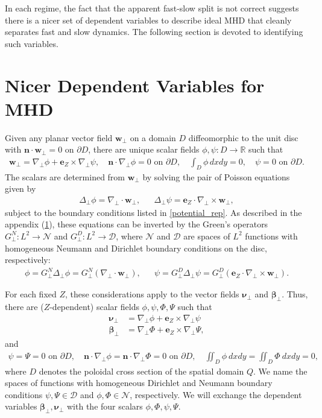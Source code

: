 \documentclass{article}
\newcommand{\np}{\nabla_\perp}
\newcommand{\lap}{\Delta_\perp}
\newcommand{\p}{\partial}
\newcommand{\GN}{G_\perp^N}
\newcommand{\GD}{G_\perp^D}
\newcommand{\pth} [1] {\left( #1 \right) }
\begin{document}
In each regime, the fact that the apparent fast-slow split is not correct suggests there is a nicer set of dependent variables to describe ideal MHD that cleanly separates fast and slow dynamics. The following section is devoted to identifying such variables.


\section{Nicer Dependent Variables for MHD}
Given any planar vector field $\bm{w}_\perp$ on a domain $D$ diffeomorphic to the unit disc with $\bm{n}\cdot\bm{w}_\perp = 0$ on $\partial D$, there are unique scalar fields $\phi,\psi:D\rightarrow\mathbb{R}$ such that
\begin{align}
\bm{w}_\perp = \np\phi + \bm{e}_Z\times\np\psi,\quad \bm{n}\cdot\np\phi = 0\text{ on }\partial D,\quad \int_D\phi \,dxdy = 0,\quad \psi = 0\text{ on }\partial D.\label{potential_rep}
\end{align}
The scalars are determined from $\bm{w}_\perp$ by solving the pair of Poisson equations given by
\begin{align} \label{poisson}
    \lap\phi = \np\cdot\bm{w}_\perp, && \lap\psi = \bm{e}_Z\cdot \np\times\bm{w}_\perp,
\end{align}
subject to the boundary conditions listed in \eqref{potential_rep}. As described in the appendix (\ref{}), these equations can be inverted by the Green's operators $\GN:L^2\to\mathcal{N}$ and $\GD:L^2\to\mathcal{D}$, where $\mathcal{N}$ and $\mathcal{D}$ are spaces of $L^2$ functions with homogeneous Neumann and Dirichlet boundary conditions on the disc, respectively:
\begin{align*}
    \phi = \GN\lap\phi = \GN\pth{\np\cdot\bm{w}_\perp}, && \psi = \GD\lap\psi = \GD\pth{\bm{e}_Z\cdot\np\times\bm{w}_\perp}.
\end{align*}

For each fixed $Z$, these considerations apply to the vector fields $\bm{\nu}_\perp$ and $\bm{\beta}_\perp$. Thus, there are ($Z$-dependent) scalar fields $\phi,\psi,\Phi,\Psi$ such that
\begin{align*}
\bm{\nu}_\perp & = \np\phi + \bm{e}_Z\times \np\psi\\
\bm{\beta}_\perp & = \np\Phi + \bm{e}_Z\times \np\Psi,
\end{align*}
and
\begin{gather*}
\psi = \Psi = 0 \text{ on } \p D,\quad \bm{n}\cdot\np\phi = \bm{n}\cdot\np\Phi = 0 \text{ on } \p D,\quad \iint_D \phi\ dxdy = \iint_D \Phi\ dxdy = 0,
\end{gather*}
where $D$ denotes the poloidal cross section of the spatial domain $Q$. We name the spaces of functions with homogeneous Dirichlet and Neumann boundary conditions $\psi,\Psi\in\mathcal{D}$ and $\phi,\Phi\in\mathcal{N}$, respectively. We will exchange the dependent variables $\bm{\beta}_\perp,\bm{\nu}_\perp$ with the four scalars $\phi,\Phi,\psi,\Psi$.
\end{document}
